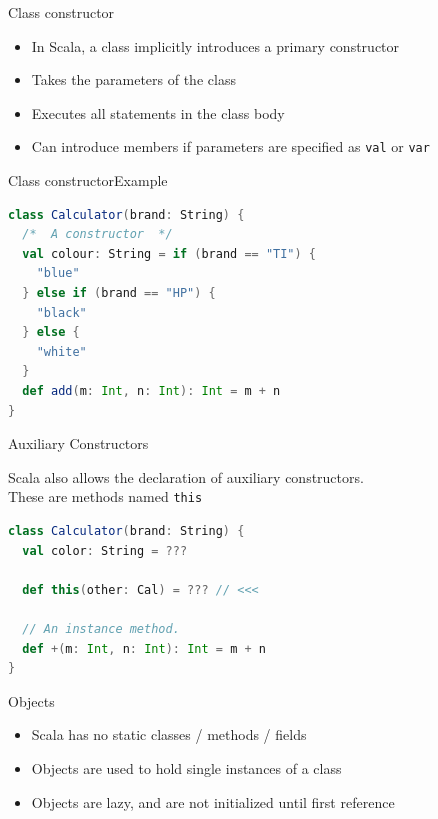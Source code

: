 \documentclass[aspectratio=169]{beamer}
\begin{document}
\begin{frame}{Class constructor}
  \begin{itemize}
    \item In Scala, a class implicitly introduces a primary constructor
    \item Takes the parameters of the class
    \item Executes all statements in the class body
    \item Can introduce members if parameters are specified as \texttt{val} or \texttt{var}
  \end{itemize}
\end{frame}

\begin{frame}[fragile]{Class constructor}{Example}
\begin{lstlisting}[style=scala,language=scala]
class Calculator(brand: String) {
  /*  A constructor  */
  val colour: String = if (brand == "TI") {
    "blue"
  } else if (brand == "HP") {
    "black"
  } else {
    "white"
  }
  def add(m: Int, n: Int): Int = m + n
}
\end{lstlisting}
\end{frame}

\begin{frame}[fragile]{Auxiliary Constructors}
  \begin{block}{}
    Scala also allows the declaration of auxiliary constructors.\\
    These are methods named \texttt{\alert{this}} 
  \end{block}
 \vspace{1em}
\begin{lstlisting}[style=scala,language=scala]
class Calculator(brand: String) {
  val color: String = ???

  def this(other: Cal) = ??? // <<<

  // An instance method.
  def +(m: Int, n: Int): Int = m + n
}
\end{lstlisting}
\end{frame}

\begin{frame}{Objects}
  \begin{itemize}
    \item Scala has no static classes / methods / fields
    \item Objects are used to hold single instances of a class
    \item Objects are lazy, and are not initialized until first reference
  \end{itemize}  
\end{frame}
\end{document}
